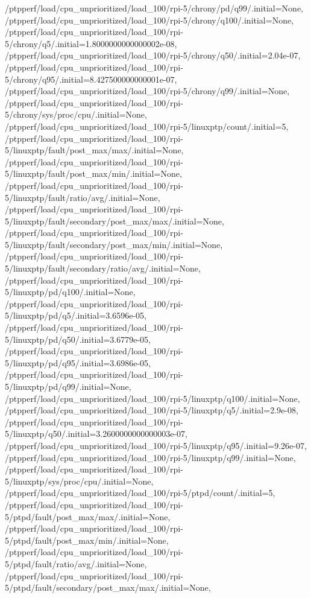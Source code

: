 {    /ptpperf/load/cpu_unprioritized/load_100/rpi-5/chrony/pd/q99/.initial=None,
    /ptpperf/load/cpu_unprioritized/load_100/rpi-5/chrony/q100/.initial=None,
    /ptpperf/load/cpu_unprioritized/load_100/rpi-5/chrony/q5/.initial=1.8000000000000002e-08,
    /ptpperf/load/cpu_unprioritized/load_100/rpi-5/chrony/q50/.initial=2.04e-07,
    /ptpperf/load/cpu_unprioritized/load_100/rpi-5/chrony/q95/.initial=8.427500000000001e-07,
    /ptpperf/load/cpu_unprioritized/load_100/rpi-5/chrony/q99/.initial=None,
    /ptpperf/load/cpu_unprioritized/load_100/rpi-5/chrony/sys/proc/cpu/.initial=None,
    /ptpperf/load/cpu_unprioritized/load_100/rpi-5/linuxptp/count/.initial=5,
    /ptpperf/load/cpu_unprioritized/load_100/rpi-5/linuxptp/fault/post_max/max/.initial=None,
    /ptpperf/load/cpu_unprioritized/load_100/rpi-5/linuxptp/fault/post_max/min/.initial=None,
    /ptpperf/load/cpu_unprioritized/load_100/rpi-5/linuxptp/fault/ratio/avg/.initial=None,
    /ptpperf/load/cpu_unprioritized/load_100/rpi-5/linuxptp/fault/secondary/post_max/max/.initial=None,
    /ptpperf/load/cpu_unprioritized/load_100/rpi-5/linuxptp/fault/secondary/post_max/min/.initial=None,
    /ptpperf/load/cpu_unprioritized/load_100/rpi-5/linuxptp/fault/secondary/ratio/avg/.initial=None,
    /ptpperf/load/cpu_unprioritized/load_100/rpi-5/linuxptp/pd/q100/.initial=None,
    /ptpperf/load/cpu_unprioritized/load_100/rpi-5/linuxptp/pd/q5/.initial=3.6596e-05,
    /ptpperf/load/cpu_unprioritized/load_100/rpi-5/linuxptp/pd/q50/.initial=3.6779e-05,
    /ptpperf/load/cpu_unprioritized/load_100/rpi-5/linuxptp/pd/q95/.initial=3.6986e-05,
    /ptpperf/load/cpu_unprioritized/load_100/rpi-5/linuxptp/pd/q99/.initial=None,
    /ptpperf/load/cpu_unprioritized/load_100/rpi-5/linuxptp/q100/.initial=None,
    /ptpperf/load/cpu_unprioritized/load_100/rpi-5/linuxptp/q5/.initial=2.9e-08,
    /ptpperf/load/cpu_unprioritized/load_100/rpi-5/linuxptp/q50/.initial=3.2600000000000003e-07,
    /ptpperf/load/cpu_unprioritized/load_100/rpi-5/linuxptp/q95/.initial=9.26e-07,
    /ptpperf/load/cpu_unprioritized/load_100/rpi-5/linuxptp/q99/.initial=None,
    /ptpperf/load/cpu_unprioritized/load_100/rpi-5/linuxptp/sys/proc/cpu/.initial=None,
    /ptpperf/load/cpu_unprioritized/load_100/rpi-5/ptpd/count/.initial=5,
    /ptpperf/load/cpu_unprioritized/load_100/rpi-5/ptpd/fault/post_max/max/.initial=None,
    /ptpperf/load/cpu_unprioritized/load_100/rpi-5/ptpd/fault/post_max/min/.initial=None,
    /ptpperf/load/cpu_unprioritized/load_100/rpi-5/ptpd/fault/ratio/avg/.initial=None,
    /ptpperf/load/cpu_unprioritized/load_100/rpi-5/ptpd/fault/secondary/post_max/max/.initial=None,
}
